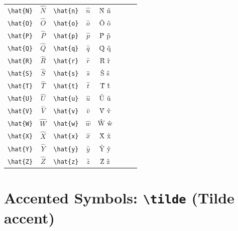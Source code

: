 \documentclass[12pt,a4paper]{article}
\begin{document}
\begin{longtable}{|l|c|l|c|c|l|c|c|}
\verb|\hat{N}| & $\hat{N}$       & \verb|\hat{n}| & $\hat{n}$       & N̂ n̂            &                 &                 & \\
\verb|\hat{O}| & $\hat{O}$       & \verb|\hat{o}| & $\hat{o}$       & Ô ô            &                 &                 & \\
\verb|\hat{P}| & $\hat{P}$       & \verb|\hat{p}| & $\hat{p}$       & P̂ p̂            &                 &                 & \\
\verb|\hat{Q}| & $\hat{Q}$       & \verb|\hat{q}| & $\hat{q}$       & Q̂ q̂            &                 &                 & \\
\verb|\hat{R}| & $\hat{R}$       & \verb|\hat{r}| & $\hat{r}$       & R̂ r̂            &                 &                 & \\
\verb|\hat{S}| & $\hat{S}$       & \verb|\hat{s}| & $\hat{s}$       & Ŝ ŝ            &                 &                 & \\
\verb|\hat{T}| & $\hat{T}$       & \verb|\hat{t}| & $\hat{t}$       & T̂ t̂            &                 &                 & \\
\verb|\hat{U}| & $\hat{U}$       & \verb|\hat{u}| & $\hat{u}$       & Û û            &                 &                 & \\
\verb|\hat{V}| & $\hat{V}$       & \verb|\hat{v}| & $\hat{v}$       & V̂ v̂            &                 &                 & \\
\verb|\hat{W}| & $\hat{W}$       & \verb|\hat{w}| & $\hat{w}$       & Ŵ ŵ            &                 &                 & \\
\verb|\hat{X}| & $\hat{X}$       & \verb|\hat{x}| & $\hat{x}$       & X̂ x̂            &                 &                 & \\
\verb|\hat{Y}| & $\hat{Y}$       & \verb|\hat{y}| & $\hat{y}$       & Ŷ ŷ            &                 &                 & \\
\verb|\hat{Z}| & $\hat{Z}$       & \verb|\hat{z}| & $\hat{z}$       & Ẑ ẑ            &                 &                 & \\
\hline
\end{longtable}

\newpage

\section*{Accented Symbols: \texttt{\textbackslash tilde} (Tilde accent)}
\end{document}
